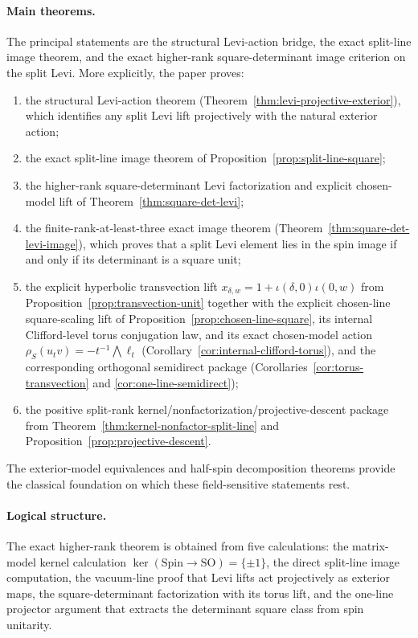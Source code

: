 \documentclass{birkjour}
\theoremstyle{plain}
\theoremstyle{definition}
\theoremstyle{remark}
\numberwithin{equation}{section}
\newcommand{\Spin}{\mathrm{Spin}}
\newcommand{\SO}{\mathrm{SO}}
\begin{document}
\paragraph{Main theorems.}
The principal statements are the structural Levi-action bridge, the exact
split-line image theorem, and the exact higher-rank square-determinant image
criterion on the split Levi. More explicitly, the paper proves:
\begin{enumerate}
\item the structural Levi-action theorem
  (Theorem~\ref{thm:levi-projective-exterior}), which identifies any split Levi
  lift projectively with the natural exterior action;
\item the exact split-line image theorem of
  Proposition~\ref{prop:split-line-square};
\item the higher-rank square-determinant Levi factorization and explicit
  chosen-model lift of
  Theorem~\ref{thm:square-det-levi};
\item the finite-rank-at-least-three exact image theorem
  (Theorem~\ref{thm:square-det-levi-image}),
  which proves that a split Levi element lies in the spin image if and only if
  its determinant is a square unit;
\item the explicit hyperbolic transvection lift
  $x_{\delta,w}=1+\iota(\delta,0)\iota(0,w)$ from
  Proposition~\ref{prop:transvection-unit} together with the explicit chosen-line
  square-scaling lift of Proposition~\ref{prop:chosen-line-square}, its internal
  Clifford-level torus conjugation law, and its exact chosen-model action
  $\rho_S(u_t v)=-t^{-1}\bigwedge \ell_t$
  (Corollary~\ref{cor:internal-clifford-torus}), and the corresponding
  orthogonal semidirect package
  (Corollaries~\ref{cor:torus-transvection} and
  \ref{cor:one-line-semidirect});
\item the positive split-rank kernel/nonfactorization/projective-descent package
  from Theorem~\ref{thm:kernel-nonfactor-split-line} and
  Proposition~\ref{prop:projective-descent}.
\end{enumerate}
The exterior-model equivalences and half-spin decomposition theorems provide
the classical foundation on which these field-sensitive
statements rest.

\paragraph{Logical structure.}
The exact higher-rank theorem is obtained from five calculations: the
matrix-model kernel calculation \(\ker(\Spin\to\SO)=\{\pm1\}\), the direct
split-line image computation, the vacuum-line proof that Levi lifts act
projectively as exterior maps, the square-determinant factorization with its
torus lift, and the one-line projector argument that extracts the determinant
square class from spin unitarity.
\end{document}
